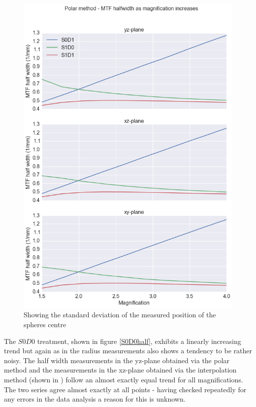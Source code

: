 \documentclass[
  twoside,
  11pt, a4paper,
  footinclude=true,
  headinclude=true,
  cleardoublepage=empty
]{scrbook}
\begin{document}
\begin{figure}[h!]
  \centering
    \includegraphics[width=\textwidth]{figures/polarmtf.png}
    \caption{Showing the standard deviation of the measured position of the spheres centre}
        \label{polarmtf}
\end{figure}

The $S0D0$ treatment, shown in figure \ref{S0D0half}, exhibits a linearly increasing trend but again as in the radius measurements also shows a tendency to be rather noisy. The half width measurements in the yz-plane obtained via the polar method and the measurements in the xz-plane obtained via the interpolation method (shown in ) follow an almost exactly equal trend for all magnifications. The two series agree almost exactly at all points - having checked repeatedly for any errors in the data analysis a reason for this is unknown.
\end{document}
